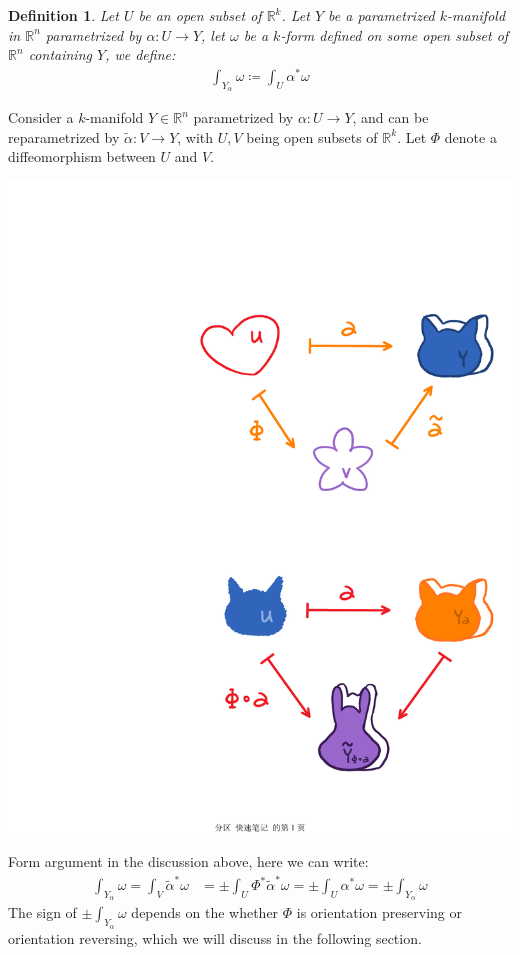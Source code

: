 \documentclass[11pt,oneside]{book}
\theoremstyle{break}
\theoremstyle{break}
\newtheorem{defn}{Definition}[corL]
\newcommand{\R}{\mathbb{R}}
\newcommand{\that}[1]{\widetilde{#1}}
\begin{document}
\begin{defn}
Let $U$ be an open subset of $\R^k$. Let $Y$ be a parametrized $k$-manifold in $\R^n$ parametrized by $\alpha:U \to Y$, let $\omega$ be a $k$-form defined on some open subset of $\R^n$ containing $Y$, we define:
\begin{align*}
\int_{Y_\alpha} \omega \coloneqq \int_U \alpha^*\omega
\end{align*} 
\end{defn}
\newpage

Consider a $k$-manifold $Y \in \R^n$ parametrized by $\alpha:U \to Y$, and can be reparametrized by $\that{\alpha}:V \to Y$, with $U,V$ being open subsets of $\R^k$. Let $\Phi$ denote a diffeomorphism between $U$ and $V$. 
\begin{center}
\includegraphics[scale=0.5]{Intkform.pdf}
\end{center}

Form argument in the discussion above, here we can write:
\begin{align*}
\int_{Y_\alpha} \omega = \int_V \that{\alpha}^*\omega &= \pm\int_U \Phi^*\that{\alpha}^*\omega = \pm \int_U \alpha^*\omega = \pm \int_{Y_\alpha} \omega
\end{align*}
The sign of $\pm \int_{Y_\alpha} \omega$ depends on the whether $\Phi$ is orientation preserving or orientation reversing, which we will discuss in the following section.\\
\end{document}
